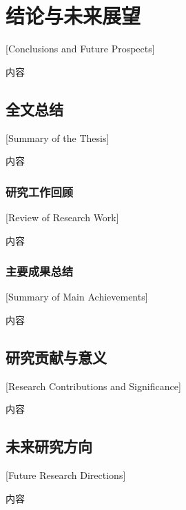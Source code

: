 \chapter{结论与未来展望}[Conclusions and Future Prospects]

内容

\section{全文总结}[Summary of the Thesis]

内容

\subsection{研究工作回顾}[Review of Research Work]

内容

\subsection{主要成果总结}[Summary of Main Achievements]

内容

\section{研究贡献与意义}[Research Contributions and Significance]

内容

\section{未来研究方向}[Future Research Directions]

内容 